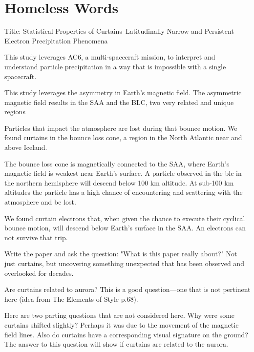 \documentclass[draft]{agujournal2019}
\begin{document}
\section{Homeless Words}

Title: Statistical Properties of Curtains--Latitudinally-Narrow and Persistent Electron Precipitation Phenomena

This study leverages AC6, a multi-spacecraft mission, to interpret and understand particle precipitation in a way that is impossible with a single spacecraft.

This study leverages the asymmetry in Earth's magnetic field. The asymmetric magnetic field results in the SAA and the BLC, two very related and unique regions

Particles that impact the atmosphere are lost during that bounce motion. We found curtains in the bounce loss cone, a region in the North Atlantic near and above Iceland.

The bounce loss cone is magnetically connected to the SAA, where Earth's magnetic field is weakest near Earth's surface. A particle observed in the blc in the northern hemisphere will descend below 100 km altitude. At sub-100 km altitudes the particle has a high chance of encountering and scattering with the atmosphere and be lost. 

We found curtain electrons that, when given the chance to execute their cyclical bounce motion, will descend below Earth's surface in the SAA. An electrons can not survive that trip.

Write the paper and ask the question: "What is this paper really about?" Not just curtains, but uncovering something unexpected that has been observed and overlooked for decades.

Are curtains related to aurora? This is a good question---one that is not pertinent here (idea from The Elements of Style p.68).

Here are two parting questions that are not considered here. Why were some curtains shifted slightly? Perhaps it was due to the movement of the magnetic field lines. Also do curtains have a corresponding visual signature on the ground? The answer to this question will show if curtains are related to the aurora.


%
\end{document}
